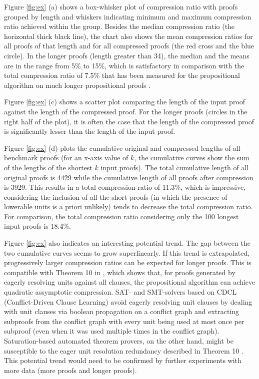 Figure \ref{fig:ex} (a) shows a box-whisker plot of compression ratio with proofs grouped by length and whiskers indicating minimum and maximum compression ratio achieved within the group. Besides the median compression ratio (the horizontal thick black line), the chart also shows the mean compression ratios for all proofs of that length and for all compressed proofs (the red cross and the blue circle). In the longer proofs (length greater than 34), the median and the means are in the range from 5\% to 15\%, which is satisfactory in comparison with the total compression ratio of 7.5\% that has been measured for the propositional {\LowerUnits} algorithm on much longer propositional proofs \cite{Boudou}.

Figure \ref{fig:ex} (c) shows a scatter plot comparing the length of the input proof against the length of the compressed proof. For the longer proofs (circles in the right half of the plot), it is often the case that the length of the compressed proof is significantly lesser than the length of the input proof.

Figure \ref{fig:ex} (d) plots the cumulative original and compressed lengths of all benchmark proofs (for an x-axis value of $k$, the cumulative curves show the sum of the lengths of the shortest $k$ input proofs). The total cumulative length of all original proofs is 4429 while the cumulative length of all proofs after compression is 3929. This results in a total compression ratio of 11.3\%, which is impressive, considering the inclusion of all the short proofs (in which the presence of lowerable units is a priori unlikely) tends to decrease the total compression ratio. For comparison, the total compression ratio considering only the 100 longest input proofs is 18.4\%.

Figure \ref{fig:ex} also indicates an interesting potential trend. The gap between the two cumulative curves seems to grow superlinearly. If this trend is extrapolated, progressively larger compression ratios can be expected for longer proofs. This is compatible with Theorem 10 in \cite{LURPI}, which shows that, for proofs generated by eagerly resolving units against all clauses, the propositional {\LowerUnits} algorithm can achieve quadratic assymptotic compression. SAT- and SMT-solvers based on CDCL (Conflict-Driven Clause Learning) avoid eagerly resolving unit clauses by dealing with unit clauses via boolean propagation on a conflict graph and extracting subproofs from the conflict graph with every unit being used at most once per subproof (even when it was used multiple times in the conflict graph). Saturation-based automated theorem provers, on the other hand, might be susceptible to the eager unit resolution redundancy described in Theorem 10 \cite{LURPI}. This potential trend would need to be confirmed by further experiments with more data (more proofs and longer proofs).

